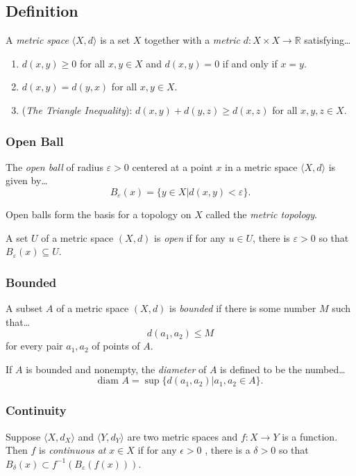 \subsection{Definition}

A \emph{metric space} $\langle X,d \rangle$ is a set $X$ together with a \emph{metric}\label{metric} $d : X \times X \rightarrow \mathbb{R}$ satisfying\dots
\begin{enumerate}
  \item $d(x,y) \geq 0$ for all $x,y \in X$ and $d(x,y) = 0$ if and only if $x = y$.
  \item $d(x,y) = d(y,x)$ for all $x,y \in X$.
  \item (\emph{The Triangle Inequality}\label{triangleinequality}): $d(x,y) + d(y,z) \geq d(x,z)$ for all $x,y,z \in X.$
\end{enumerate}

\subsubsection{Open Ball}\label{metricopenball}
The \emph{open ball} of radius $\varepsilon > 0$ centered at a point $x$ in a metric space $\langle X,d \rangle$ is given by\dots
$$B_{\varepsilon}(x) = \{ y \in X | d(x,y) < \varepsilon\}.$$\newline

\noindent Open balls form the basis for a topology on $X$ called the \emph{metric topology}.\newline

\noindent A set $U$ of a metric space $(X,d)$ is \emph{open} if for any $u \in U$, there is $\varepsilon > 0$ so that $B_{\varepsilon}(x) \subseteq U$.

\subsubsection{Bounded}\label{bounded}
A subset $A$ of a metric space $(X,d)$ is \emph{bounded} if there is some number $M$ such that\dots
$$d(a_1,a_2) \leq M$$
for every pair $a_1,a_2$ of points of $A$.\newline

\noindent If $A$ is bounded and nonempty, the \emph{diameter} of $A$ is defined to be the numbed\dots
$$\textrm{diam } A = \sup \{ d(a_1,a_2) | a_1,a_2 \in A \}.$$

\subsubsection{Continuity}\label{metriccontinuity}
Suppose $\langle X,d_X \rangle$ and $\langle Y,d_Y \rangle$ are two metric spaces and $f: X \rightarrow Y$ is a function. Then $f$ is \emph{continuous at} $x\in X$ if for any $\epsilon > 0$ , there is a $\delta > 0$
so that $B_{\delta}(x) \subset f^{-1}(B_{\varepsilon}(f(x)))$.\newline

